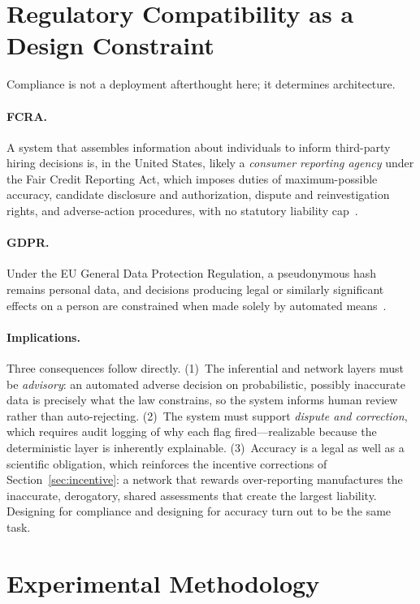 \documentclass[11pt]{article}
\begin{document}
\section{Regulatory Compatibility as a Design Constraint}\label{sec:legal}
Compliance is not a deployment afterthought here; it determines architecture.

\paragraph{FCRA.} A system that assembles information about individuals to inform
third-party hiring decisions is, in the United States, likely a \emph{consumer
reporting agency} under the Fair Credit Reporting Act, which imposes duties of
maximum-possible accuracy, candidate disclosure and authorization, dispute and
reinvestigation rights, and adverse-action procedures, with no statutory
liability cap~\cite{fcra}.

\paragraph{GDPR.} Under the EU General Data Protection Regulation, a pseudonymous
hash remains personal data, and decisions producing legal or similarly
significant effects on a person are constrained when made solely by automated
means~\cite{gdpr}.

\paragraph{Implications.} Three consequences follow directly.
(1)~The inferential and network layers must be \emph{advisory}: an automated
adverse decision on probabilistic, possibly inaccurate data is precisely what the
law constrains, so the system informs human review rather than auto-rejecting.
(2)~The system must support \emph{dispute and correction}, which requires audit
logging of why each flag fired---realizable because the deterministic layer is
inherently explainable. (3)~Accuracy is a legal as well as a scientific
obligation, which reinforces the incentive corrections of
Section~\ref{sec:incentive}: a network that rewards over-reporting manufactures
the inaccurate, derogatory, shared assessments that create the largest liability.
Designing for compliance and designing for accuracy turn out to be the same task.

\section{Experimental Methodology}\label{sec:method}
\end{document}
